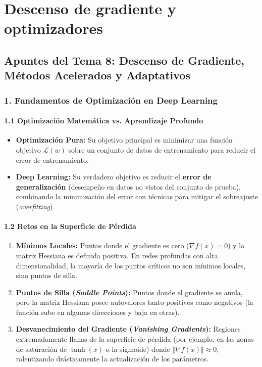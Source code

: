 \chapter{Descenso de gradiente y optimizadores}
\section{Apuntes del Tema 8: Descenso de Gradiente, Métodos Acelerados y Adaptativos}

\subsection{1. Fundamentos de Optimización en Deep Learning}

\subsubsection{1.1 Optimización Matemática vs. Aprendizaje Profundo}

\begin{itemize}
	\item \textbf{Optimización Pura:} Su objetivo principal es minimizar una función objetivo $\mathcal{L}(w)$ sobre un conjunto de datos de entrenamiento para reducir el error de entrenamiento.
	
	\item \textbf{Deep Learning:} Su verdadero objetivo es reducir el \textbf{error de generalización} (desempeño en datos no vistos del conjunto de prueba), combinando la minimización del error con técnicas para mitigar el sobreajuste (\emph{overfitting}).
\end{itemize}

\subsubsection{1.2 Retos en la Superficie de Pérdida}

\begin{enumerate}
	\item \textbf{Mínimos Locales:} Puntos donde el gradiente es cero ($\nabla f(x) = 0$) y la matriz Hessiana es definida positiva. En redes profundas con alta dimensionalidad, la mayoría de los puntos críticos no son mínimos locales, sino puntos de silla.
	
	\item \textbf{Puntos de Silla (\emph{Saddle Points}):} Puntos donde el gradiente se anula, pero la matriz Hessiana posee autovalores tanto positivos como negativos (la función sube en algunas direcciones y baja en otras).
	
	\item \textbf{Desvanecimiento del Gradiente (\emph{Vanishing Gradients}):} Regiones extremadamente llanas de la superficie de pérdida (por ejemplo, en las zonas de saturación de $\tanh(x)$ o la sigmoide) donde $\Vert \nabla f(x)\Vert \approx 0$, ralentizando drásticamente la actualización de los parámetros.
\end{enumerate}

